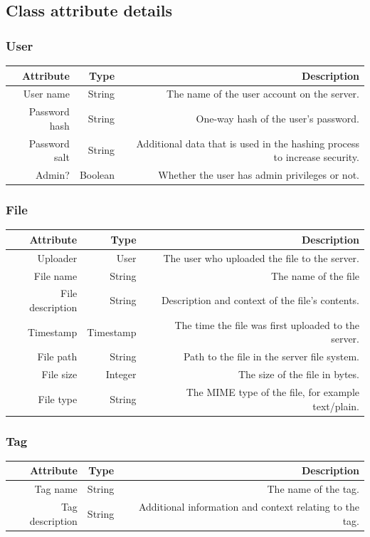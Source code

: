 \documentclass[10pt,a4paper]{article}
\begin{document}
\subsection{Class attribute details}
\subsubsection{User}
\begin{tabularx}{\textwidth}{|R|R|R|} \hline
\textbf{Attribute} & \textbf{Type} & \textbf{Description}\\ \hline
User name & String & The name of the user account on the server.\\ \hline
Password hash & String & One-way hash of the user's password.\\ \hline
Password salt & String & Additional data that is used in the hashing process to increase security.\\ \hline
Admin? & Boolean & Whether the user has admin privileges or not.\\ \hline
\end{tabularx}

\subsubsection{File}
\begin{tabularx}{\textwidth}{|R|R|R|} \hline
\textbf{Attribute} & \textbf{Type} & \textbf{Description}\\ \hline
Uploader & User & The user who uploaded the file to the server.\\ \hline
File name & String & The name of the file\\ \hline
File description & String & Description and context of the file's contents.\\ \hline
Timestamp & Timestamp & The time the file was first uploaded to the server.\\ \hline
File path & String & Path to the file in the server file system.\\ \hline
File size & Integer & The size of the file in bytes.\\ \hline
File type & String & The MIME type of the file, for example text/plain.\\ \hline
\end{tabularx}

\subsubsection{Tag}
\begin{tabularx}{\textwidth}{|R|R|R|} \hline
\textbf{Attribute} & \textbf{Type} & \textbf{Description}\\ \hline
Tag name & String & The name of the tag.\\ \hline
Tag description & String & Additional information and context relating to the tag.\\ \hline
\end{tabularx}
\end{document}
